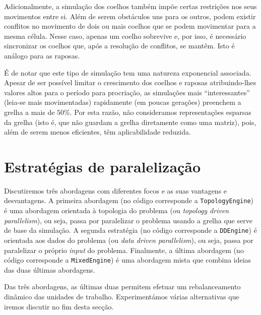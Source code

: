 \documentclass[10pt,a4paper,oneside]{article}
\begin{document}
Adicionalmente, a simulação dos coelhos também impõe certas restrições
nos seus movimentos entre si. Além de serem obstáculos uns para os
outros, podem existir conflitos no movimento de dois ou mais coelhos
que se podem movimentar para a mesma célula. Nesse caso, apenas um
coelho sobrevive e, por isso, é necessário sincronizar os coelhos que,
após a resolução de conflitos, se mantêm. Isto é análogo para as
raposas.

É de notar que este tipo de simulação tem uma natureza exponencial
associada. Apesar de ser possível limitar o crescimento dos coelhos e
raposas atribuindo-lhes valores altos para o período para procriação,
as simulações mais ``interessantes'' (leia-se mais movimentadas)
rapidamente (em poucas gerações) preenchem a grelha a mais de
$50\%$. Por esta razão, não consideramos representações esparsas da
grelha (isto é, que não guardam a grelha diretamente como uma matriz),
pois, além de serem menos eficientes, têm aplicabilidade reduzida.


\section{Estratégias de paralelização}
\label{sec:par}
Discutiremos três abordagens com diferentes focos e as suas vantagens
e desvantagens. A primeira abordagem (no código corresponde a
\texttt{TopologyEngine}) é uma abordagem orientada à topologia do
problema (ou \textit{topology driven parallelism}), ou seja, passa por
paralelizar o problema usando a grelha que serve de base da
simulação. A segunda estratégia (no código corresponde a
\texttt{DDEngine}) é orientada aos dados do problema (ou \textit{data
  driven parallelism}), ou seja, passa por paralelizar o próprio
\textit{input} do problema. Finalmente, a última abordagem (no código
corresponde a \texttt{MixedEngine}) é uma abordagem mista que combina
ideias das duas últimas abordagens.

Das três abordagens, as últimas duas permitem efetuar um
rebalanceamento dinâmico das unidades de trabalho. Experimentámos
várias alternativas que iremos discutir no fim desta secção.
\end{document}
